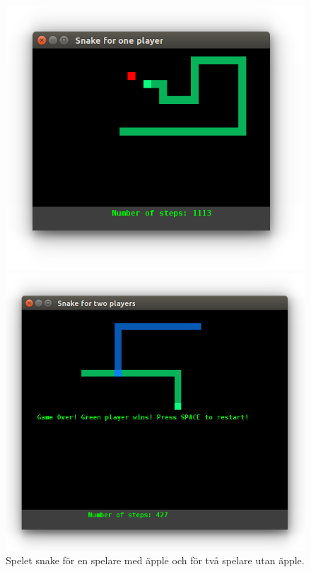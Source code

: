 \begin{figure}[H]
\begin{minipage}{0.45\textwidth}
\includegraphics[width=1.0\textwidth]{../img/snake-oneplayer}
\end{minipage}
\begin{minipage}{0.5\textwidth}
\includegraphics[width=1.0\textwidth]{../img/snake-twoplayer}
\end{minipage}
\caption{Spelet snake för en spelare med äpple och för två spelare utan äpple. \label{fig:snake-game}}
\end{figure}

